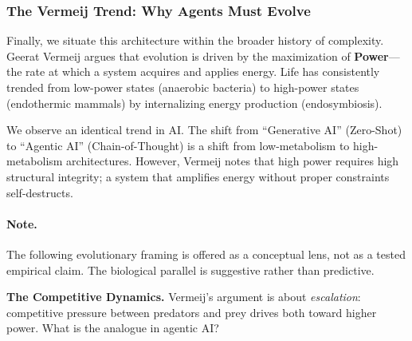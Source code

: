 \subsubsection{The Vermeij Trend: Why Agents Must Evolve}

Finally, we situate this architecture within the broader history of complexity. Geerat Vermeij \cite{vermeij2023power}
argues that evolution is driven by the maximization of \textbf{Power}---the rate at which a system acquires and
applies energy. Life has consistently trended from low-power states (anaerobic bacteria) to high-power states
(endothermic mammals) by internalizing energy production (endosymbiosis).

We observe an identical trend in AI. The shift from ``Generative AI'' (Zero-Shot) to ``Agentic AI'' (Chain-of-Thought)
is a shift from low-metabolism to high-metabolism architectures. However, Vermeij notes that high power requires
high structural integrity; a system that amplifies energy without proper constraints self-destructs.

\paragraph{Note.}
The following evolutionary framing is offered as a conceptual lens, not as a
tested empirical claim.  The biological parallel is suggestive rather than
predictive.

\textbf{The Competitive Dynamics.} Vermeij's argument is about \textit{escalation}: competitive pressure
between predators and prey drives both toward higher power. What is the analogue in agentic AI?

